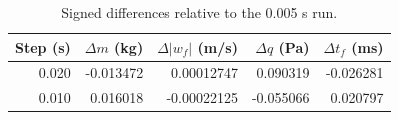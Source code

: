 \begin{table}[htbp]
\centering\small
\caption{Signed differences relative to the 0.005 s run.}
\label{tab:differences}
\begin{tabularx}{\linewidth}{@{}rrrrr@{}}
\toprule
Step (s) & $\Delta m$ (kg) & $\Delta |w_f|$ (m/s) & $\Delta q$ (Pa) & $\Delta t_f$ (ms) \\
\midrule
0.020 & -0.013472 & 0.00012747 & 0.090319 & -0.026281 \\
0.010 & 0.016018 & -0.00022125 & -0.055066 & 0.020797 \\
\bottomrule
\end{tabularx}
\end{table}
